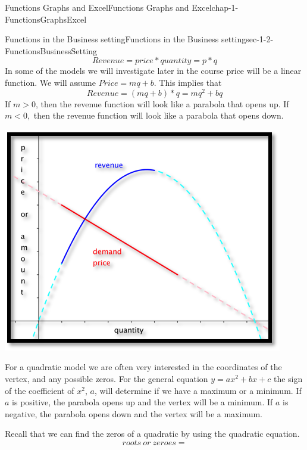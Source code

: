 \documentclass[oneside,10pt,]{book}
\numberwithin{equation}{section}
\newcommand{\lt}{<}
\begin{document}
\begin{chapterptx}{Functions Graphs and Excel}{}{Functions Graphs and Excel}{}{}{chap-1-FunctionsGraphsExcel}
\begin{sectionptx}{Functions in the Business setting}{}{Functions in the Business setting}{}{}{sec-1-2-FunctionsBusinessSetting}
\begin{equation*}
Revenue=price*quantity=p*q
\end{equation*}
In some of the models we will investigate later in the course price will be a linear function. We will assume \(Price=m q+b\). This implies that%
\begin{equation*}
Revenue=(m q+b)*q=m q^2+b q
\end{equation*}
If \(m > 0\), then the revenue function will look like a parabola that opens up. If \(m \lt 0,\) then the revenue function will look like a parabola that opens down.%
\begin{sidebyside}{1}{0.25}{0.25}{0}%
\begin{sbspanel}{0.5}%
\includegraphics[width=1\linewidth]{images/sec1-2-QuadraticFunctions.png}
\end{sbspanel}%
\end{sidebyside}%
\par
\hypertarget{p-140}{}%
For a quadratic model we are often very interested in the coordinates of the vertex, and any possible zeros. For the general equation \(y=a x^2+b x+c\) the sign of the coefficient of \(x^2\), \(a\), will determine if we have a maximum or a minimum. If \(a\) is positive, the parabola opens up and the vertex will be a minimum. If \(a\) is negative, the parabola opens down and the vertex will be a maximum.%
\par
\hypertarget{p-141}{}%
Recall that we can find the zeros of a quadratic by using the quadratic equation.%
\begin{equation*}
roots\ or\ zeroes  =  

\end{equation*}
\end{sectionptx}
\end{chapterptx}
\end{document}
